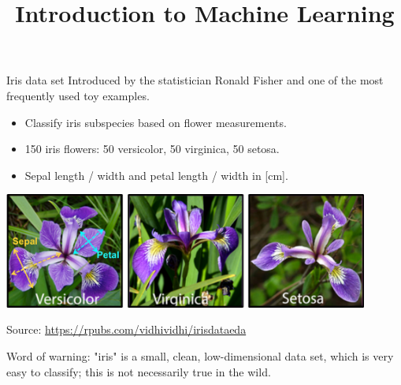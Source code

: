 




\newcommand{\titlefigure}{figure/sample-dgp-2d.pdf}
\newcommand{\learninggoals}{
\item Understand structure of tabular data in ML 
\item Understand difference between target and features 
\item Understand difference between labeled and unlabeled data 
\item Know concept of data-generating process}

\title{Introduction to Machine Learning}
\date{}




\begin{vbframe}{Iris data set}
Introduced by the statistician Ronald Fisher and one
of the most frequently used toy examples.
\begin{itemize}
\item Classify iris subspecies based on flower measurements.
\item 150 iris flowers: 50 versicolor, 50 virginica, 50 setosa.
\item Sepal length / width and petal length / width in [cm].
\end{itemize}

\begin{center}
\includegraphics[width=0.9\textwidth]{figure_man/iris_species.png} 

\tiny
Source: \url{https://rpubs.com/vidhividhi/irisdataeda}
\normalsize
\end{center}

Word of warning: "iris" is a small, clean, low-dimensional data set,
which is very easy to classify; this is not necessarily true in the wild. 

\end{vbframe}

